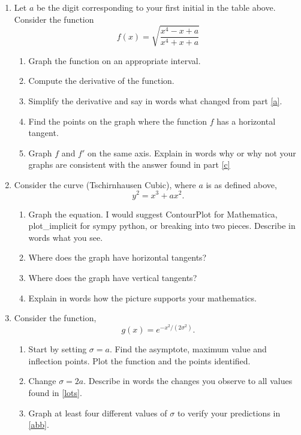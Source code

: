 \documentclass[11pt]{article}
\begin{document}
\begin{enumerate}
\item Let $a$ be the digit corresponding to your first initial in the table above.  Consider the function 
\[f(x)=\sqrt{\frac{x^4-x+a}{x^4+x+a}}\]
\begin{enumerate}
\item Graph the function on an appropriate interval.
\item Compute the derivative of the function.\label{a}
\item Simplify the derivative and say in words what changed from part \ref{a}.
\item Find the points on the graph where the function $f$ has a horizontal tangent.\label{c}
\item Graph $f$ and $f'$ on the same axis.  Explain in words why or why not your graphs are consistent with the answer found in part \ref{c}
\end{enumerate}




\item Consider the curve (Tschirnhausen Cubic), where $a$ is as defined above,
\[
y^2=x^3+a x^2.
\]
\begin{enumerate}
\item Graph the equation.  I would suggest ContourPlot for Mathematica, plot\_implicit for sympy python, or breaking into two pieces.  Describe in words what you see.
\item Where does the graph have horizontal tangents?
\item Where does the graph have vertical tangents?
\item Explain in words how the picture supports your mathematics.

\end{enumerate}
\item Consider the function, 
\[
g(x)=e^{-x^2/\left(2\sigma^2\right)}.
\]
\begin{enumerate}
\item Start by setting $\sigma=a$.  Find the asymptote, maximum value and inflection points.  Plot the function and the points identified.\label{lots}
\item Change $\sigma=2a$.  Describe in words the changes you observe to all values found in \ref{lots}.\label{abb}
\item Graph at least four different values of $\sigma$ to verify your predictions in \ref{abb}.
\end{enumerate}
\end{enumerate}
\end{document}
